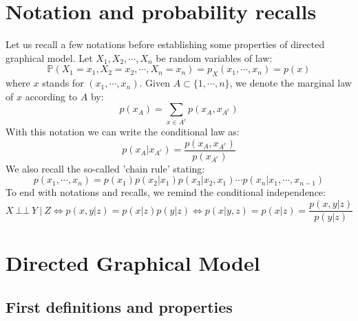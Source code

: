 \documentclass[12pt]{report}
\newcommand{\indep}{\ensuremath{\,\bot\!\!\!\bot\,}} %
\begin{document}
 
 

\maketitle



\section{Notation and probability recalls}


Let us recall a few notations before establishing some properties of directed graphical model. Let $X_1, X_2, \cdots, X_n$ be random variables of law: 
\begin{equation*}
\mathbb{P}(X_1 = x_1, X_2 = x_2, \cdots, X_n = x_n) = p_X (x_1, \cdots, x_n) = p(x)
\end{equation*}
where $x$ stands for $(x_1, \cdots, x_n)$. Given $A\subset \{1, \cdots, n\}$, we denote the marginal law of $x$ according to $A$ by: 
\begin{equation*}
p(x_A) = \sum_{x\in {A^c}} p(x_A, x_{A^c})
\end{equation*}
With this notation we can write the conditional law as: 
\begin{equation*}
p( x_A | x_{A^c} ) = \frac{p(x_A, x_{A^c})}{p(x_{A^c})}
\end{equation*}
We also recall the so-called 'chain rule' stating:
\begin{equation*}
p(x_1, \cdots, x_n) = p(x_1) p(x_2 | x_1) p(x_3 | x_2, x_1) \cdots p(x_n | x_1, \cdots, x_{n-1})
\end{equation*}
To end with notations and recalls, we remind the conditional independence: 
\begin{equation*}
X\indep Y \ | \ Z \Leftrightarrow p\left(x,y|z\right)=p\left(x|z\right)p\left(y|z\right) \Leftrightarrow p\left(x|y,z\right)=p\left(x|z\right)=\frac{p\left(x,y|z\right)}{p\left(y|z\right)}
\end{equation*}





\section{Directed Graphical Model}

\subsection{First definitions and properties}
\end{document}
